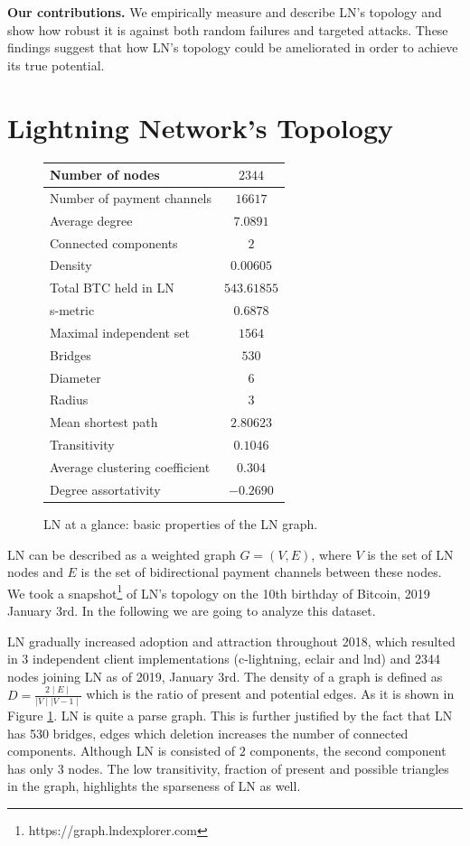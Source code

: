 \documentclass[a4paper]{article}
\theoremstyle{definition}
\def\bitcoinA{%
	\leavevmode
	\vtop{\offinterlineskip %
		\setbox0=\hbox{B}%
		\setbox2=\hbox to\wd0{\hfil\hskip-.03em
			\vrule height .3ex width .15ex\hskip .08em
			\vrule height .3ex width .15ex\hfil}
		\vbox{\copy2\box0}\box2}}
\begin{document}
\textbf{Our contributions.} We empirically measure and describe LN's topology and show how robust it is against both random failures and targeted attacks. These findings suggest that how LN's topology could be ameliorated in order to achieve its true potential.
\section{Lightning Network's Topology}
\begin{figure}
	\begin{tabular}{ | l | c | }
		\hline
		Number of nodes & $2344$  \\ \hline
		Number of payment channels & $16617$  \\ \hline
		Average degree & $7.0891$ \\ \hline
		Connected components & $2$  \\ \hline
		Density & $0.00605$ \\ \hline
		Total BTC held in LN & $543.61855$\bitcoinA\\ \hline
		s-metric& $0.6878$ \\ \hline
		Maximal independent set & $1564$ \\ \hline
		Bridges & $530$ \\ \hline
		Diameter & $6$ \\ \hline
		Radius & $3$ \\ \hline
		Mean shortest path &  $2.80623$ \\ \hline
		Transitivity& $0.1046$\\ \hline
		Average clustering coefficient&$0.304$ \\ \hline
		Degree assortativity& $-0.2690$ \\ \hline
	\end{tabular}
	\caption{LN at a glance: basic properties of the LN graph.}\label{fig:properties}
\end{figure}

LN can be described as a weighted graph $G=(V,E)$, where $V$ is the set of LN nodes and $E$ is the set of bidirectional payment channels between these nodes. We took a snapshot\footnote{https://graph.lndexplorer.com} of LN's topology on the 10th birthday of Bitcoin, 2019 January 3rd. In the following we are going to analyze this dataset.

LN gradually increased adoption and attraction throughout 2018, which resulted in 3 independent client implementations (c-lightning, eclair and lnd) and \num[group-separator={,}]{2344} nodes joining LN as of 2019, January 3rd. The density of a graph is defined as $D=\frac{2\mid E\mid}{\mid V\mid \mid V-1\mid}$  which is the ratio of present and potential edges. As it is shown in Figure \ref{fig:properties}. LN is quite a parse graph. This is further justified by the fact that LN has \num[group-separator={,}]{530} bridges, edges which deletion increases the number of connected components. Although LN is consisted of $2$ components, the second component has only $3$ nodes. The low transitivity, fraction of present and possible triangles in the graph, highlights the sparseness of LN as well.
\end{document}
